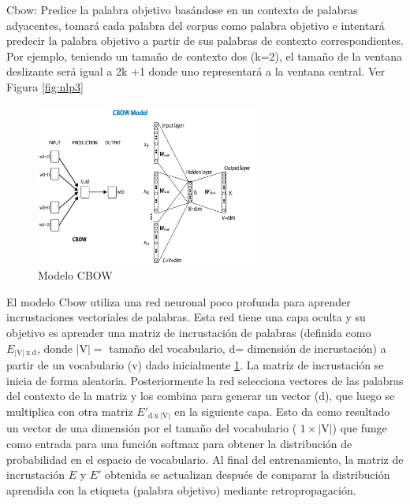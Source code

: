 \begin{itemize}
\begin{itemize}
Cbow: Predice la palabra objetivo basándose en un contexto de palabras adyacentes, tomará cada palabra del corpus como palabra objetivo e intentará predecir la palabra objetivo a partir de sus palabras de contexto correspondientes. Por ejemplo, teniendo un tamaño de contexto dos (k=2), el  tamaño de la ventana deslizante será igual a 2k +1 donde uno representará  a la ventana central. Ver Figura \ref{fig:nlp3}



\begin{figure}[h!]
	\includegraphics[width=0.65\textwidth]{capitulo3/figuras/nlp4.png}
	\caption{Modelo CBOW}
	\label{fig:nlp4}
\end{figure}

El modelo Cbow utiliza una red neuronal poco profunda para aprender incrustaciones vectoriales de palabras. Esta red tiene una capa oculta y su objetivo es aprender una matriz de incrustación de palabras (definida como $E_{ \left | \textrm{V}  \right |\: \textrm{x} \: \textrm{d}}$,  donde $\left | \textrm{V}  \right | = $ tamaño del vocabulario, d= dimensión de incrustación)  a partir de un vocabulario (v)  dado inicialmente  \ref{fig:nlp4}. La matriz de incrustación se inicia de forma aleatoria. Posteriormente  la red selecciona vectores de las palabras del contexto de la matriz y los combina para generar un vector (d), que luego se multiplica con otra matriz ${E}'_{ \textrm{d} \: \textrm{x}  \:\left | \textrm{V}  \right | }$ en la siguiente capa. Esto da como resultado un vector de una dimensión por el tamaño del vocabulario ( $1 \times \left | \textrm{V}  \right |$) que funge como entrada para una función softmax para obtener la distribución de probabilidad en el espacio de vocabulario. Al final del entrenamiento, la matriz de incrustación $E$ y $E'$ obtenida se actualizan después de comparar la distribución aprendida con la etiqueta (palabra objetivo) mediante retropropagación.


\end{itemize}
\end{itemize}
